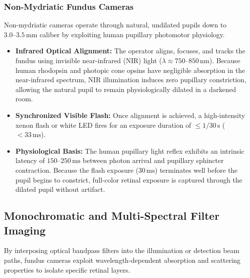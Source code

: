 \documentclass[11pt,a4paper]{article}
\begin{document}
\subsubsection{Non-Mydriatic Fundus Cameras}
Non-mydriatic cameras operate through natural, undilated pupils down to $3.0\text{--}3.5\,\text{mm}$ caliber by exploiting human pupillary photomotor physiology.
\begin{itemize}[leftmargin=*]
    \item \textbf{Infrared Optical Alignment:} The operator aligns, focuses, and tracks the fundus using invisible near-infrared (NIR) light ($\lambda \approx 750\text{--}850\,\text{nm}$). Because human rhodopsin and photopic cone opsins have negligible absorption in the near-infrared spectrum, NIR illumination induces zero pupillary constriction, allowing the natural pupil to remain physiologically dilated in a darkened room.
    \item \textbf{Synchronized Visible Flash:} Once alignment is achieved, a high-intensity xenon flash or white LED fires for an exposure duration of $\le 1/30\,\text{s}$ ($< 33\,\text{ms}$).
    \item \textbf{Physiological Basis:} The human pupillary light reflex exhibits an intrinsic latency of $150\text{--}250\,\text{ms}$ between photon arrival and pupillary sphincter contraction. Because the flash exposure ($30\,\text{ms}$) terminates well before the pupil begins to constrict, full-color retinal exposure is captured through the dilated pupil without artifact.
\end{itemize}

\subsection{Monochromatic and Multi-Spectral Filter Imaging}

By interposing optical bandpass filters into the illumination or detection beam paths, fundus cameras exploit wavelength-dependent absorption and scattering properties to isolate specific retinal layers.
\end{document}
